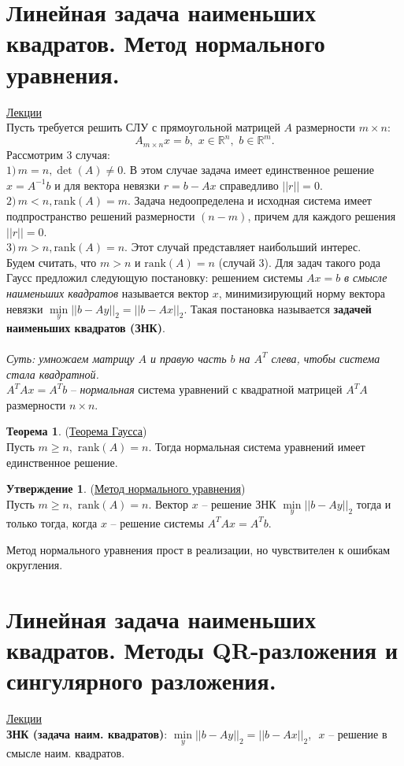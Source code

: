 \documentclass[specialist, subf, href, colorlinks=true, 12pt, times, mtpro, final]{disser}
\theoremstyle{definition}
\newtheorem{state}{Утверждение}[section]
\newtheorem{theorem}{Теорема}[section]
\def\rk{\text{rank}}
\begin{document}
\section {Линейная задача наименьших квадратов. Метод нормального уравнения.}
	\hyperlink {lects.71}{Лекции}\\
	Пусть требуется решить СЛУ с прямоугольной матрицей $A$ размерности $m\times n$:
	$$
	    A_{m\times n} x = b, \,\, x\in \mathds{R}^n, \,\, b \in \mathds{R}^m.
	$$
	Рассмотрим 3 случая:\\
	$1)\, m = n, \det(A) \ne 0.$ В этом случае задача имеет единственное решение
	$x = A^{-1}b$ и для вектора невязки $r = b - Ax$ справедливо $||r|| = 0$.\\
	$2)\, m < n, \rk(A) = m.$ Задача недоопределена и исходная система имеет подпространство решений размерности $(n - m)$, причем для каждого решения $||r|| = 0$.\\
	$3)\, m > n, \rk(A) = n.$ Этот случай представляет наибольший интерес.\\
	Будем считать, что $m>n$ и $\rk(A) = n$ (случай 3). Для задач такого рода Гаусс предложил следующую постановку: решением системы $Ax=b$ {\it в смысле наименьших
	квадратов} называется вектор $x$, минимизирующий норму вектора невязки
	$\min\limits_{y}||b - Ay||_2 = ||b - Ax||_2$. Такая постановка называется
	{\bf задачей наименьших квадратов (ЗНК)}.\\
	\\
	{\it Суть: умножаем матрицу $A$ и правую часть $b$ на $A^T$ слева, чтобы система стала квадратной.}\\
	$A^T Ax = A^T b$ -- {\it нормальная} система уравнений с квадратной матрицей $A^T A$
	размерности $n\times n$.
	\begin{theorem} (\hyperlink {lects.71}{Теорема Гаусса})\\
	Пусть $m \ge n, \,\, \rk(A) = n$. Тогда нормальная система уравнений имеет единственное
	решение.
	\end{theorem}
	\begin{state} (\hyperlink {lects.71}{Метод нормального уравнения})\\
	Пусть $m \ge n, \,\, \rk(A) = n$. Вектор $x$ -- решение ЗНК $\min\limits_{y}||b-Ay||_2$
	тогда и только тогда, когда $x$ -- решение системы $A^T Ax = A^T b$.
	\end{state}
	Метод нормального уравнения прост в реализации, но чувствителен к ошибкам округления.

\section {Линейная задача наименьших квадратов. Методы QR-разложения и сингулярного разложения.}
	\hyperlink {lects.72}{Лекции}\\
	{\bf ЗНК (задача наим. квадратов)}: $\min\limits_{y}||b - Ay||_2 = ||b - Ax||_2$,\,\, $x$ -- решение в смысле наим. квадратов.\\
\end{document}
